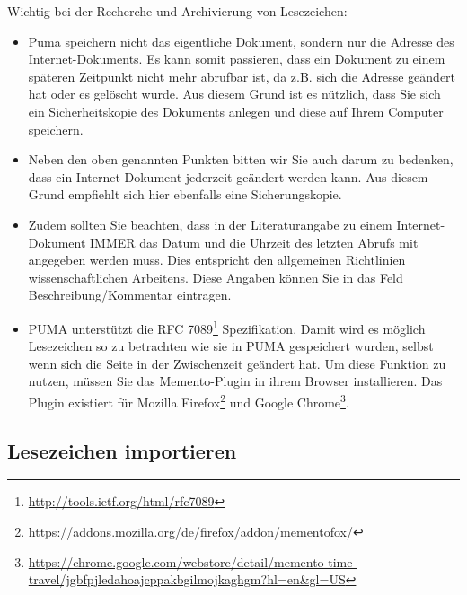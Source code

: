 \documentclass[a4paper,11pt,twoside]{scrbook}
\begin{document}
Wichtig bei der Recherche und Archivierung von Lesezeichen:
\begin{itemize}
    \item Puma speichern nicht das eigentliche Dokument, sondern nur die Adresse des Internet-Dokuments. Es kann somit passieren, dass ein Dokument zu einem späteren Zeitpunkt nicht mehr abrufbar ist, da z.B. sich die Adresse geändert hat oder es gelöscht wurde.  Aus diesem Grund ist es nützlich, dass Sie sich ein Sicherheitskopie des Dokuments anlegen und diese auf Ihrem Computer speichern.
    \item Neben den oben genannten Punkten bitten wir Sie auch darum zu bedenken, dass ein Internet-Dokument jederzeit geändert werden kann. Aus diesem Grund empfiehlt sich hier ebenfalls eine Sicherungskopie. 
    \item Zudem sollten Sie beachten, dass in der Literaturangabe zu einem Internet-Dokument IMMER das Datum und die Uhrzeit des letzten Abrufs mit angegeben werden muss. Dies entspricht den allgemeinen Richtlinien wissenschaftlichen Arbeitens. Diese Angaben können Sie in das Feld Beschreibung/Kommentar eintragen.
    \item PUMA unterstützt die RFC 7089\footnote{\url{http://tools.ietf.org/html/rfc7089}} Spezifikation. Damit wird es möglich Lesezeichen so zu betrachten wie sie in PUMA gespeichert wurden, selbst wenn sich die Seite in der Zwischenzeit geändert hat. Um diese Funktion zu nutzen, müssen Sie das Memento-Plugin in ihrem Browser installieren. Das Plugin existiert für Mozilla Firefox\footnote{\url{https://addons.mozilla.org/de/firefox/addon/mementofox/}} und Google Chrome\footnote{\url{https://chrome.google.com/webstore/detail/memento-time-travel/jgbfpjledahoajcppakbgilmojkaghgm?hl=en&gl=US}}. 
\end{itemize} 
\subsection{Lesezeichen importieren}
\end{document}
